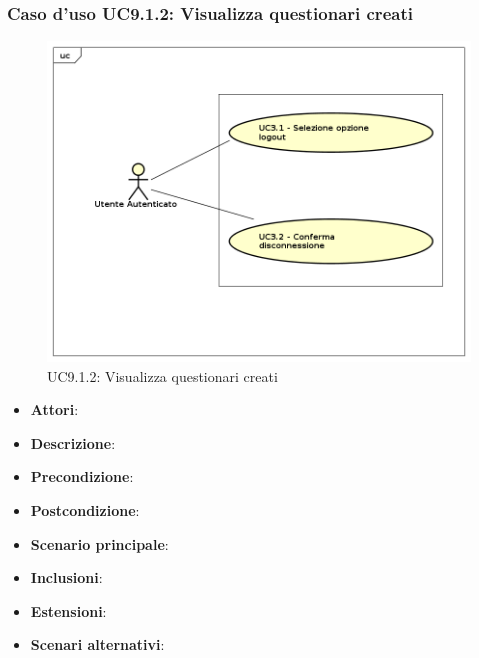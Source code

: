 		\subsubsection{Caso d'uso UC9.1.2: Visualizza questionari creati}
		\label{UC9.1.2}
		\begin{figure}[h]
			\centering
		\includegraphics[scale=0.7,keepaspectratio]{UML/UC9.png}
			\caption{UC9.1.2: Visualizza questionari creati}
		\end{figure}
		\FloatBarrier
		\begin{itemize}
			\item \textbf{Attori}: 
			\item \textbf{Descrizione}: 
			\item \textbf{Precondizione}: 
			\item \textbf{Postcondizione}: 
			\item \textbf{Scenario principale}:
			\item \textbf{Inclusioni}:
			\item \textbf{Estensioni}:
			\item \textbf{Scenari alternativi}:
		\end{itemize}
		
